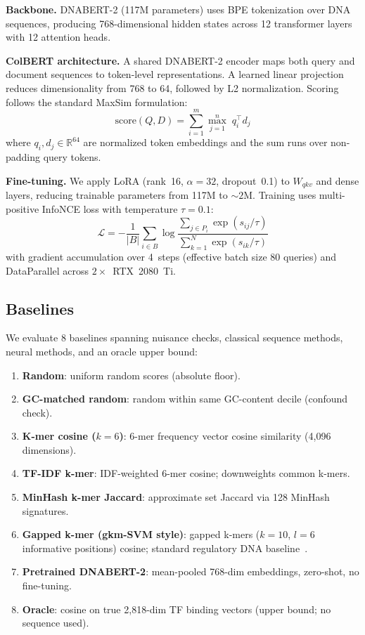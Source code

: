 \documentclass[10pt,twocolumn]{article}
\begin{document}
\textbf{Backbone.}
DNABERT-2 (117M parameters) uses BPE tokenization over DNA sequences, producing 768-dimensional hidden states across 12 transformer layers with 12 attention heads.

\textbf{ColBERT architecture.}
A shared DNABERT-2 encoder maps both query and document sequences to token-level representations. A learned linear projection reduces dimensionality from 768 to 64, followed by L2 normalization. Scoring follows the standard MaxSim formulation:
\begin{equation}
\text{score}(Q, D) = \sum_{i=1}^{m} \max_{j=1}^{n}\; q_i^\top d_j
\label{eq:maxsim}
\end{equation}
where $q_i, d_j \in \mathbb{R}^{64}$ are normalized token embeddings and the sum runs over non-padding query tokens.

\textbf{Fine-tuning.}
We apply LoRA (rank~16, $\alpha{=}32$, dropout~0.1) to $W_{qkv}$ and dense layers, reducing trainable parameters from 117M to ${\sim}2$M. Training uses multi-positive InfoNCE loss with temperature $\tau{=}0.1$:
\begin{equation}
\mathcal{L} = -\frac{1}{|B|} \sum_{i \in B} \log \frac{\sum_{j \in P_i} \exp(s_{ij}/\tau)}{\sum_{k=1}^{N} \exp(s_{ik}/\tau)}
\end{equation}
with gradient accumulation over 4~steps (effective batch size 80 queries) and DataParallel across $2{\times}$~RTX~2080~Ti.

\subsection{Baselines}
\label{sec:baselines}

We evaluate 8 baselines spanning nuisance checks, classical sequence methods, neural methods, and an oracle upper bound:

\begin{enumerate}
    \item \textbf{Random}: uniform random scores (absolute floor).
    \item \textbf{GC-matched random}: random within same GC-content decile (confound check).
    \item \textbf{K-mer cosine ($k{=}6$)}: 6-mer frequency vector cosine similarity (4,096 dimensions).
    \item \textbf{TF-IDF k-mer}: IDF-weighted 6-mer cosine; downweights common k-mers.
    \item \textbf{MinHash k-mer Jaccard}: approximate set Jaccard via 128 MinHash signatures.
    \item \textbf{Gapped k-mer (gkm-SVM style)}: gapped k-mers ($k{=}10$, $l{=}6$ informative positions) cosine; standard regulatory DNA baseline~\citep{ghandi2014gkmsvm}.
    \item \textbf{Pretrained DNABERT-2}: mean-pooled 768-dim embeddings, zero-shot, no fine-tuning.
    \item \textbf{Oracle}: cosine on true 2,818-dim TF binding vectors (upper bound; no sequence used).
\end{enumerate}
\end{document}
